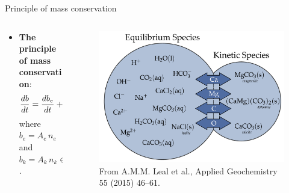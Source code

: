 \begin{frame}{Principle of mass conservation}
	\begin{columns}
		\begin{column}{0.4\textwidth}
			\begin{itemize}
				\item {\bf The principle of mass conservation}: 
				\[
				\frac{{d} b}{dt} = \frac{{d}  b_{e}}{dt}+\frac{{\rm d}  b_{k}}{dt}=0, 
				\]
				where $b_{e} = A_{e} \, n_e$ and $b_{k} = A_k \, n_k  \in \mathbb{R}^{E}$.
			\end{itemize}
		\end{column}
		\begin{column}{0.6\textwidth} 
			\vskip 10pt
			\begin{figure}
				\centering
				\includegraphics[height=0.7\textheight]{figures/chemical-kinetics/kinetic-equilibrium-element-exchange.png}
				\caption*{From A.M.M. Leal et al., Applied Geochemistry 55 (2015) 46--61.}
			\end{figure}
		\end{column}
	\end{columns}
\end{frame}
%
%
